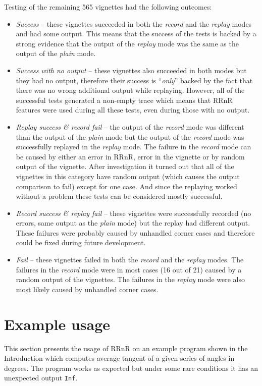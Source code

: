 \documentclass[thesis=M,english,hidelinks]{FITthesis}[2012/10/20]
\newcommand*{\qt}[1]{\enquote{{\itshape#1}}}
\begin{document}
	Testing of the remaining 565 vignettes had the following outcomes:
	\begin{itemize}
		\item \emph{Success} -- these vignettes succeeded in both the \emph{record} and the \emph{replay} modes and had some output. This means that the success of the tests is backed by a strong evidence that the output of the \emph{replay} mode was the same as the output of the \emph{plain} mode.
		
		\item \emph{Success with no output} -- these vignettes also succeeded in both modes but they had no output, therefore their success is \qt{only} backed by the fact that there was no wrong additional output while replaying. However, all of the successful tests generated a non-empty trace which means that RRnR features were used during all these tests, even during those with no output.
		
		\item \emph{Replay success \& record fail} -- the output of the \emph{record} mode was different than the output of the \emph{plain} mode but the output of the \emph{record} mode was successfully replayed in the \emph{replay} mode. The failure in the \emph{record} mode can be caused by either an error in RRnR, error in the vignette or by random output of the vignette. After investigation it turned out that all of the vignettes in this category have random output (which causes the output comparison to fail) except for one case. And since the replaying worked without a problem these tests can be considered mostly successful.
		
		\item \emph{Record success \& replay fail} -- these vignettes were successfully recorded (no errors, same output as the \emph{plain} mode) but the replay had different output. These failures were probably caused by unhandled corner cases and therefore could be fixed during future development.
		
		\item \emph{Fail} -- these vignettes failed in both the \emph{record} and the \emph{replay} modes. The failures in the \emph{record} mode were in most cases (16 out of 21) caused by a random output of the vignettes. The failures in the \emph{replay} mode were also most likely caused by unhandled corner cases.
	\end{itemize}

	\section{Example usage}
	This section presents the usage of RRnR on an example program shown in the Introduction which computes average tangent of a given series of angles in degrees. The program works as expected but under some rare conditions it has an unexpected output \lstinline|Inf|.\par
	
\end{document}
